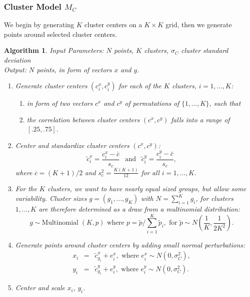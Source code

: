 \documentclass[12pt]{article}\usepackage[]{graphicx}\usepackage[]{color}
\newtheorem{algorithm}[theorem]{Algorithm}
\begin{document}
\subsubsection{Cluster Model \texorpdfstring{$M_C$}{Mc}} 
We begin by generating $K$ cluster centers on a $K \times K$ grid, then we generate points around selected cluster centers. 
\begin{algorithm}\hfill\newline
  Input Parameters:  $N$ points, $K$ clusters, $\sigma_C$ cluster standard deviation \\
  Output: $N$ points, in form of vectors $x$ and $y$. 
  \begin{enumerate}
    \item Generate cluster centers $(c^x_{i}, c^y_{i})$ for each of the $K$ clusters, $i=1, ..., K$:
      \begin{enumerate}
        \item in form of two vectors $c^{x}$ and $c^y$ of permutations of $\{1, ..., K\}$, such that
        \item the correlation between cluster centers $(c^{x}, c^{y})$ falls into a range of $[.25, .75]$.
      \end{enumerate}
      \item Center and standardize cluster centers $(c^x, c^y)$:  
      \[
        \tilde{c}^x_{i} = \frac{c^x_{i} - \bar{c}}{s_c} \ \ \text{ and } \ \ \tilde{c}^y_{i} = \frac{c^y_{i} - \bar{c}}{s_c},
      \]
      where $\overline{c} = (K+1)/2$ and $s_c^2 = \frac{K(K+1)}{12}$ for all $i = 1, ..., K$.
    \item For the $K$ clusters, we want to have nearly equal sized groups, but allow some variability. Cluster sizes  $g = (g_1, ..., g_K)$ with $N = \sum_{i=1}^K g_i$, for clusters $1, ..., K$ are therefore determined as a draw from a multinomial distribution: 
    \[
    g \sim \text{Multinomial }(K, p) \text{ where } p = \tilde{p}/\sum_{i=1}^K \tilde{p}_i, \text{ for } \tilde{p} \sim N \left(\frac{1}{K}, \frac{1}{2 K^2} \right).
    \]
     
    \item Generate points around cluster centers by adding small normal perturbations: 
      \begin{eqnarray*}
        x_i &=& \tilde{c}^x_{g_i} + e^x_i, \text{ where } e^x_i \sim N(0, \sigma^2_C),\\
        y_i &=& \tilde{c}^y_{g_i} + e^y_i, \text{ where } e^y_i \sim N(0, \sigma^2_C).
      \end{eqnarray*}
    \item Center and scale $x_i$, $y_i$.
  \end{enumerate}
\end{algorithm} 
\end{document}
